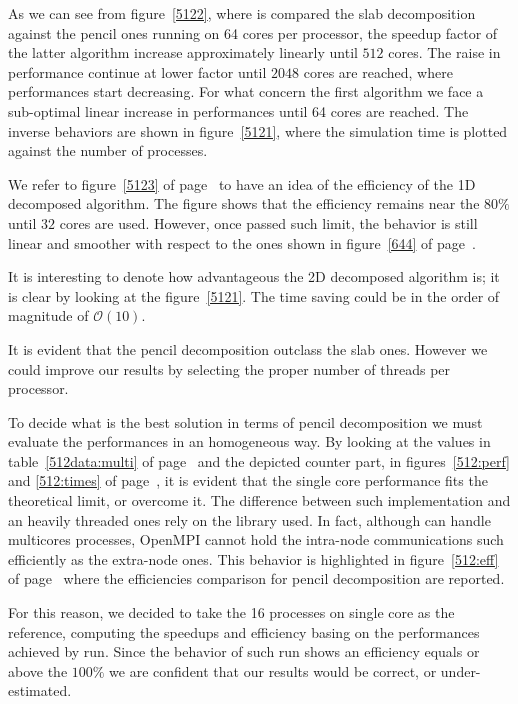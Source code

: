 As we can see from figure~\ref{5122}, where is compared the slab decomposition against the pencil ones running on 64 cores per processor, the speedup factor of the latter algorithm increase approximately linearly until $512$ cores. The raise in performance continue at lower factor until $2048$ cores are reached, where performances start decreasing. For what concern the first algorithm we face a sub-optimal linear increase in performances until 64 cores are reached. 
The inverse behaviors are shown in figure~\ref{5121}, where the simulation time is plotted against the number of processes.
\par
We refer to figure~\ref{5123} of page~\pageref{5123} to have an idea of the efficiency of the 1D decomposed algorithm. The figure shows that the efficiency remains near the $80\%$ until $32$ cores are used. However, once passed such limit, the behavior is still linear and smoother with respect to the ones shown in figure~\ref{644} of page~\pageref{644}.  \\
\par
It is interesting to denote how advantageous the 2D decomposed algorithm is; it is clear by looking at the figure~\ref{5121}. The time saving could be in the order of magnitude of $\mathcal{O}(10)$.\\
\par
It is evident that the pencil decomposition outclass the slab ones. However we could improve our results by selecting the proper number of threads per processor. 
\par
To decide what is the best solution in terms of pencil decomposition we must evaluate the performances in an homogeneous way.
By looking at the values in table~\ref{512data:multi} of page~\pageref{512data:multi} and the depicted counter part, in figures~\ref{512:perf} and \ref{512:times} of page~\pageref{512:perf}, it is evident that the single core performance fits the theoretical limit, or overcome it. The difference between such implementation and an heavily threaded ones rely on the library used. In fact, although can handle multicores processes, OpenMPI cannot hold the intra-node communications such efficiently as the extra-node ones. This behavior is highlighted in figure~\ref{512:eff} of page~\pageref{512:eff} where the efficiencies comparison for pencil decomposition are reported.
\par
For this reason, we decided to take the 16 processes on single core as the reference, computing the speedups and efficiency basing on the performances achieved by run. Since the behavior of such run shows an efficiency equals or above the $100\%$ we are confident that our results would be correct, or under-estimated.

